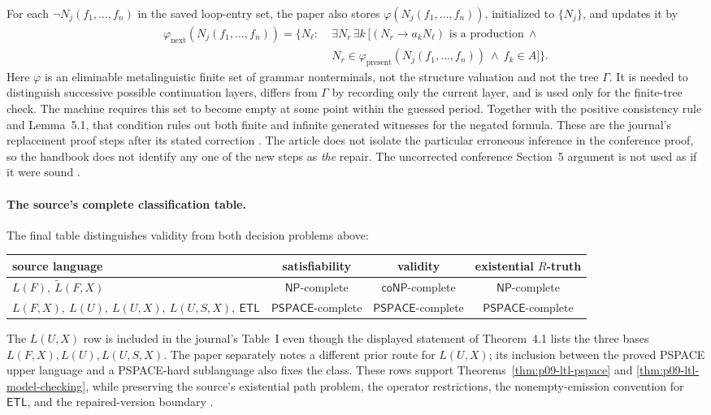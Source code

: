 For each \(\neg N_j(f_1,\ldots,f_n)\) in the saved loop-entry set, the paper
also stores
\(\varphi(N_j(f_1,\ldots,f_n))\), initialized to \(\{N_j\}\), and updates it
by
\[
\begin{split}
 \varphi_{\mathrm{next}}(N_j(f_1,\ldots,f_n))
 =\{N_\ell:\;&\exists N_r\,\exists k\,
 [(N_r\to a_kN_\ell)\text{ is a production}\ \land\\
 & N_r\in\varphi_{\mathrm{present}}(N_j(f_1,\ldots,f_n))
   \ \land\ f_k\in A]\}.
\end{split}
\]
Here \(\varphi\) is an eliminable metalinguistic finite set of grammar
nonterminals, not the structure valuation and not the tree \(\Gamma\).  It is
needed to distinguish successive possible continuation layers, differs from
\(\Gamma\) by recording only the current layer, and is used only for the
finite-tree check.  The machine requires this set to become empty at some
point within the guessed period.  Together with the positive consistency
rule and Lemma~5.1, that condition rules out both finite and infinite
generated witnesses for the negated formula.  These are the journal's
replacement proof steps after its stated correction
\cite[pp.~745--748]{SistlaClarke1985}.  The article does
not isolate the particular erroneous inference in the conference proof, so the
handbook does not identify any one of the new steps as \emph{the} repair.  The
uncorrected conference Section~5 argument is not used as if it were sound
\cite[pp.~166--167]{SistlaClarke1982}.

\paragraph{The source's complete classification table.}
The final table distinguishes validity from both decision problems above:
\begin{center}
\small
\begin{tabular}{@{}lccc@{}}
\toprule
source language
& satisfiability
& validity
& existential \(R\)-truth\\
\midrule
\(L(F),\ \widetilde L(F,X)\)
& \(\mathsf{NP}\)-complete
& \(\mathsf{coNP}\)-complete
& \(\mathsf{NP}\)-complete\\
\(L(F,X),\ L(U),\ L(U,X),\ L(U,S,X),\ \mathsf{ETL}\)
& \(\mathsf{PSPACE}\)-complete
& \(\mathsf{PSPACE}\)-complete
& \(\mathsf{PSPACE}\)-complete\\
\bottomrule
\end{tabular}
\end{center}
The \(L(U,X)\) row is included in the journal's Table~I even though the
displayed statement of Theorem~4.1 lists the three bases
\(L(F,X),L(U),L(U,S,X)\).  The paper separately notes a different prior
route for \(L(U,X)\); its inclusion between the proved PSPACE upper language
and a PSPACE-hard sublanguage also fixes the class.  These rows support
Theorems~\ref{thm:p09-ltl-pspace} and
\ref{thm:p09-ltl-model-checking}, while preserving the source's existential
path problem, the operator restrictions, the nonempty-emission convention for
\(\mathsf{ETL}\), and the repaired-version boundary
\cite[p.~748]{SistlaClarke1985}.

